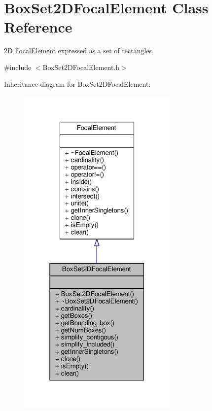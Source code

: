 \hypertarget{classBoxSet2DFocalElement}{}\section{Box\+Set2\+D\+Focal\+Element Class Reference}
\label{classBoxSet2DFocalElement}


2\+D \hyperlink{classFocalElement}{Focal\+Element} expressed as a set of rectangles.  




{\ttfamily \#include $<$Box\+Set2\+D\+Focal\+Element.\+h$>$}



Inheritance diagram for Box\+Set2\+D\+Focal\+Element\+:\nopagebreak
\begin{figure}[H]
\begin{center}
\leavevmode
\includegraphics[width=223pt]{classBoxSet2DFocalElement__inherit__graph}
\end{center}
\end{figure}


